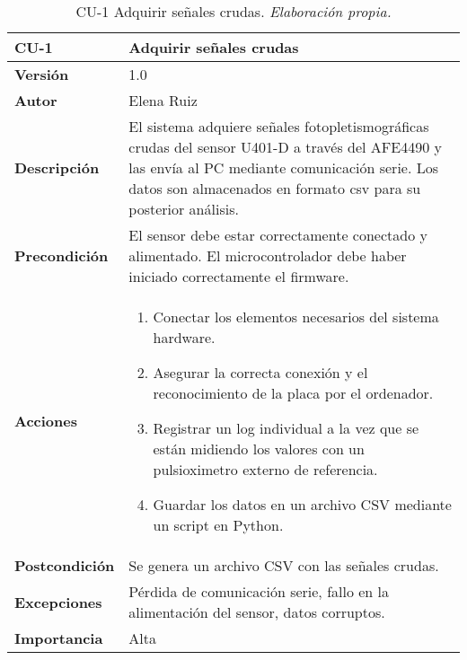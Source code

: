 \begin{table}[H]
	\centering
	\begin{tabularx}{\linewidth}{ p{} p{} }
		\toprule
		\textbf{CU-1}    & \textbf{Adquirir señales crudas} \\
		\toprule
		\textbf{Versión}              & 1.0 \\
		\textbf{Autor}                & Elena Ruiz \\
		\textbf{Descripción}          & El sistema adquiere señales fotopletismográficas crudas del sensor U401-D a través del AFE4490 y las envía al PC mediante comunicación serie. Los datos son almacenados en formato csv para su posterior análisis.\\
		\textbf{Precondición}         & El sensor debe estar correctamente conectado y alimentado. El microcontrolador debe haber iniciado correctamente el firmware. \\
		\textbf{Acciones}             &
		\begin{enumerate}
			\item Conectar los elementos necesarios del sistema hardware.
			\item Asegurar la correcta conexión y el reconocimiento de la placa por el ordenador.
			\item Registrar un log individual a la vez que se están midiendo los valores con un pulsioximetro externo de referencia.
			\item Guardar los datos en un archivo CSV mediante un script en Python.
		\end{enumerate} \\
		\textbf{Postcondición}        & Se genera un archivo CSV con las señales crudas. \\
		\textbf{Excepciones}          & Pérdida de comunicación serie, fallo en la alimentación del sensor, datos corruptos. \\
		\textbf{Importancia}          & Alta \\
		\bottomrule
	\end{tabularx}
	\caption{CU-1 Adquirir señales crudas. \textit{Elaboración propia.}}
\end{table}


